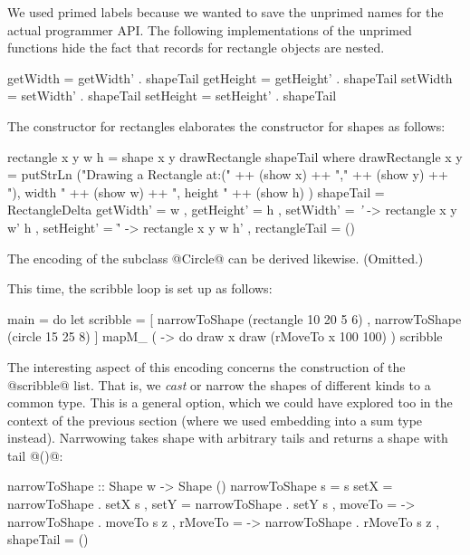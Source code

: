 \documentclass{jfp}
\newcommand{\w}[1]{\textit{#1}}
\begin{document}
We used primed labels because we wanted to save the unprimed names for
the actual programmer API. The following implementations of the
unprimed functions hide the fact that records for rectangle objects are
nested.

\begin{code}
 getWidth  = getWidth'  . shapeTail
 getHeight = getHeight' . shapeTail
 setWidth  = setWidth'  . shapeTail
 setHeight = setHeight' . shapeTail
\end{code}

The constructor for rectangles elaborates the constructor for shapes as follows:

\begin{code}
 rectangle x y w h
   = shape x y drawRectangle shapeTail
  where
   drawRectangle x y
     =  putStrLn ("Drawing a Rectangle at:("
     ++ (show x)
     ++ ","
     ++ (show y)
     ++ "), width "
     ++ (show w)
     ++ ", height "
     ++ (show h) )
   shapeTail 
     = RectangleDelta { getWidth'     = w 
                      , getHeight'    = h
                      , setWidth'     = \w' -> rectangle x y w' h
                      , setHeight'    = \h' -> rectangle x y w h'
                      , rectangleTail = ()
                      }
\end{code}

The encoding of the subclass @Circle@ can be derived likewise. (Omitted.)

This time, the scribble loop is set up as follows:

\begin{code}
 main =
       do
          let scribble = [ narrowToShape (rectangle 10 20 5 6)
                         , narrowToShape (circle 15 25 8)
                         ]
          mapM_ ( \x -> 
                    do
                       draw x
                       draw (rMoveTo x 100 100) )
                scribble
\end{code}

The interesting aspect of this encoding concerns the construction of
the @scribble@ list. That is, we \emph{cast} or narrow the shapes of
different kinds to a common type. This is a general option, which we
could have explored too in the context of the previous section (where
we used embedding into a sum type instead). Narrwowing takes shape
with arbitrary tails and returns a shape with tail @()@:

\begin{code}
 narrowToShape :: Shape w -> Shape ()
 narrowToShape s = s { setX      = narrowToShape . setX s
                     , setY      = narrowToShape . setY s 
                     , moveTo    = \z -> narrowToShape . moveTo s z 
                     , rMoveTo   = \z -> narrowToShape . rMoveTo s z
                     , shapeTail = ()
                     }
\end{code}
\end{document}
